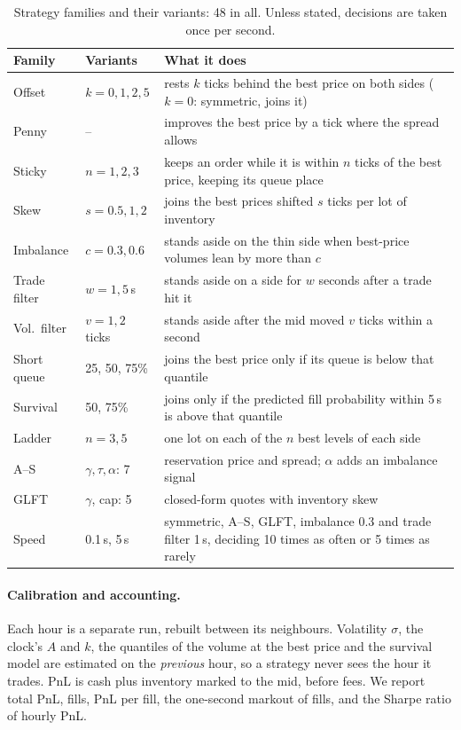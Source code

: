 \begin{table}[t]
\centering\footnotesize
\caption{Strategy families and their variants: 48 in all. Unless stated,
decisions are taken once per second.}
\label{tab:families}
\setlength{\tabcolsep}{3pt}
\begin{tabular}{@{}p{}p{}p{}@{}}
\toprule
Family & Variants & What it does \\
\midrule
Offset & $k=0,1,2,5$ & rests $k$ ticks behind the best price on both sides ($k=0$: symmetric, joins it) \\
Penny & -- & improves the best price by a tick where the spread allows \\
Sticky & $n=1,2,3$ & keeps an order while it is within $n$ ticks of the best price, keeping its queue place \\
Skew & $s=0.5,1,2$ & joins the best prices shifted $s$ ticks per lot of inventory \\
Imbalance & $c=0.3,0.6$ & stands aside on the thin side when best-price volumes lean by more than $c$ \\
Trade filter & $w=1,5$\,s & stands aside on a side for $w$ seconds after a trade hit it \\
Vol.\ filter & $v=1,2$ ticks & stands aside after the mid moved $v$ ticks within a second \\
Short queue & 25, 50, 75\% & joins the best price only if its queue is below that quantile \\
Survival & 50, 75\% & joins only if the predicted fill probability within 5\,s is above that quantile \\
Ladder & $n=3,5$ & one lot on each of the $n$ best levels of each side \\
A--S & $\gamma,\tau,\alpha$: 7 & reservation price and spread; $\alpha$ adds an imbalance signal \\
GLFT & $\gamma$, cap: 5 & closed-form quotes with inventory skew \\
Speed & 0.1\,s, 5\,s & symmetric, A--S, GLFT, imbalance 0.3 and trade filter 1\,s, deciding 10 times as often or 5 times as rarely \\
\bottomrule
\end{tabular}
\end{table}

\paragraph{Calibration and accounting.}
Each hour is a separate run, rebuilt between its neighbours. Volatility $\sigma$,
the clock's $A$ and $k$, the quantiles of the volume at the best price and the
survival model are estimated on the \emph{previous} hour, so a strategy never sees
the hour it trades. PnL is cash plus
inventory marked to the mid, before fees. We report total PnL, fills, PnL per
fill, the one-second markout of fills, and the Sharpe ratio of hourly PnL.

